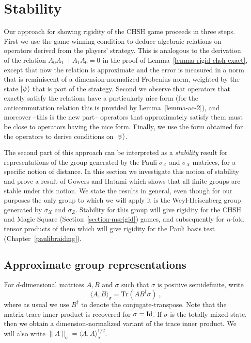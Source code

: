 \section{Stability}
\label{section-stability}

Our approach for showing rigidity of the CHSH game proceeds in three steps. First we use the game winning condition to deduce algebraic relations on operators derived from the players' strategy. This is analogous to the derivation of the relation $A_0A_1+A_1A_0=0$ in the proof of Lemma~\ref{lemma-rigid-chsh-exact}, except that now the relation is approximate and the error is measured in a norm that is reminiscent of a dimension-normalized Frobenius norm, weighted by the state $|\psi\rangle$ that is part of the strategy. Second we observe that operators that exactly satisfy the relations have a particularly nice form (for the anticommutation relation this is provided by Lemma~\ref{lemma-ac-2}), and moreover --this is the new part-- operators that approximately satisfy them must be close to operators having the nice form. Finally, we use the form obtained for the operators to derive conditions on $|\psi\rangle$. 

The second part of this approach can be interpreted as a \emph{stability} result for representations of the group generated by the Pauli $\sigma_Z$ and $\sigma_X$ matrices, for a specific notion of distance. In this section we investigate this notion of stability and prove a result of Gowers and Hatami which shows that all finite groups are stable under this notion. We state the results in general, even though for our purposes the only group to which we will apply it is the Weyl-Heisenberg group generated by $\sigma_X$ and $\sigma_Z$. Stability for this group  will give rigidity for the CHSH and Magic Square (Section~\ref{section-msrigid}) games, and subsequently for $n$-fold tensor products of them which will give rigidity for the Pauli basis test (Chapter~\ref{paulibraiding}).


\subsection{Approximate group representations}
\label{subsection-approxrep}

For $d$-dimensional matrices  $A,B$ and $\sigma$ such that $\sigma$ is positive semidefinite, write 
$$\langle A,B\rangle_\sigma = \mathrm{Tr}(AB^\dagger \sigma)\;,$$
where as usual we use $B^\dagger$ to denote the conjugate-transpose. Note that the matrix trace inner product is recovered for $\sigma = \mathop{\rm Id}\nolimits$. If $\sigma$ is the totally mixed state, then we obtain a dimension-normalized variant of the trace inner product. We will also write $\|A\|_\sigma = \langle A,A\rangle_\sigma^{1/2}$. 


